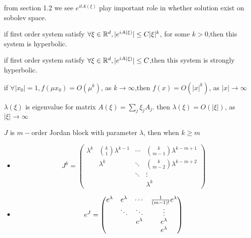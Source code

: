 \documentclass[../main]{subfiles}
\begin{document}
from section 1.2 we see $e^{it A(\xi)}$ play important role in whether solution exist on sobolev space.

\begin{defn}
    if first order system satisfy $\forall \xi\in \mathbb{R}^d, |e^{i A(\xi)}|\le C|\xi|^k$, for some $k>0$,then this system is hyperbolic.
\end{defn}

\begin{defn}
    if first order system satisfy $\forall \xi\in \mathbb{R}^d, |e^{i A(\xi)}|\le C$,then this system is strongly hyperbolic.
\end{defn}

\begin{lem}
    if $\forall |x_0|=1, f(\mu x_0)=O(\mu^k)$, as $k\to \infty $,then $f(x)=O(|x|^k)$, as $ |x| \to \infty$
\end{lem}
\vspace{5cm}

\begin{lem}
    $\lambda({\xi})$ is eigenvalue for matrix $A(\xi)=\sum_j \xi_j A_j$. then $\lambda(\xi)=O(|\xi|)$, as $|\xi|\to \infty$
\end{lem}
\newpage

\begin{lem}
    $J$ is $m-$order Jordan block with parameter $\lambda$, then when $k\ge m$
    \begin{itemize}
        \item \begin{equation}
            J^k=\begin{pmatrix}
                \lambda^k &\binom{k}{1}\lambda^{k-1} & \cdots & \binom{k}{m-1}\lambda^{k-m+1}\\
                & \lambda^k & \ddots &\binom{k}{m-2}\lambda^{k-m+2}\\
                &  &\ddots & \vdots\\
                & & & \lambda^k
            \end{pmatrix}
        \end{equation}
        \item \begin{equation}
            e^J=\begin{pmatrix}
                e^\lambda & e^\lambda &\cdots & \frac{1}{(m-1)!}e^\lambda\\
                & \ddots &\ddots &\vdots\\
                & & e^\lambda &e^\lambda\\
                & & & e^\lambda
            \end{pmatrix}
        \end{equation}
    \end{itemize}
\end{lem}
\vspace{5cm}
\end{document}
